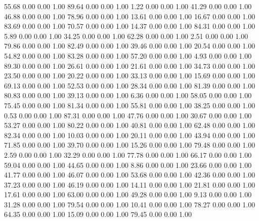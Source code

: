    55.68   0.00   0.00   1.00
   89.64   0.00   0.00   1.00
    1.22   0.00   0.00   1.00
   41.29   0.00   0.00   1.00
   46.88   0.00   0.00   1.00
   78.96   0.00   0.00   1.00
   13.61   0.00   0.00   1.00
   16.67   0.00   0.00   1.00
   83.69   0.00   0.00   1.00
   70.57   0.00   0.00   1.00
   14.37   0.00   0.00   1.00
   84.31   0.00   0.00   1.00
    5.89   0.00   0.00   1.00
   34.25   0.00   0.00   1.00
   62.28   0.00   0.00   1.00
    2.51   0.00   0.00   1.00
   79.86   0.00   0.00   1.00
   82.49   0.00   0.00   1.00
   39.46   0.00   0.00   1.00
   20.54   0.00   0.00   1.00
   54.82   0.00   0.00   1.00
   83.28   0.00   0.00   1.00
   57.20   0.00   0.00   1.00
    4.93   0.00   0.00   1.00
   89.30   0.00   0.00   1.00
   26.61   0.00   0.00   1.00
   21.61   0.00   0.00   1.00
   34.73   0.00   0.00   1.00
   23.50   0.00   0.00   1.00
   20.22   0.00   0.00   1.00
   33.13   0.00   0.00   1.00
   15.69   0.00   0.00   1.00
   69.13   0.00   0.00   1.00
   52.53   0.00   0.00   1.00
   28.34   0.00   0.00   1.00
   81.39   0.00   0.00   1.00
   80.83   0.00   0.00   1.00
   39.13   0.00   0.00   1.00
    6.36   0.00   0.00   1.00
   58.05   0.00   0.00   1.00
   75.45   0.00   0.00   1.00
   81.34   0.00   0.00   1.00
   55.81   0.00   0.00   1.00
   38.25   0.00   0.00   1.00
    0.53   0.00   0.00   1.00
   87.31   0.00   0.00   1.00
   47.76   0.00   0.00   1.00
   30.67   0.00   0.00   1.00
   53.27   0.00   0.00   1.00
   80.22   0.00   0.00   1.00
   40.81   0.00   0.00   1.00
   62.48   0.00   0.00   1.00
   82.34   0.00   0.00   1.00
   10.03   0.00   0.00   1.00
   20.11   0.00   0.00   1.00
   43.94   0.00   0.00   1.00
   71.85   0.00   0.00   1.00
   39.70   0.00   0.00   1.00
   15.26   0.00   0.00   1.00
   79.48   0.00   0.00   1.00
    2.59   0.00   0.00   1.00
   32.29   0.00   0.00   1.00
   77.78   0.00   0.00   1.00
   66.17   0.00   0.00   1.00
   59.04   0.00   0.00   1.00
   44.65   0.00   0.00   1.00
    8.86   0.00   0.00   1.00
   23.66   0.00   0.00   1.00
   41.77   0.00   0.00   1.00
   46.07   0.00   0.00   1.00
   53.68   0.00   0.00   1.00
   42.36   0.00   0.00   1.00
   37.23   0.00   0.00   1.00
   46.19   0.00   0.00   1.00
   14.11   0.00   0.00   1.00
   21.81   0.00   0.00   1.00
   17.61   0.00   0.00   1.00
   63.00   0.00   0.00   1.00
   49.28   0.00   0.00   1.00
    9.13   0.00   0.00   1.00
   31.28   0.00   0.00   1.00
   79.54   0.00   0.00   1.00
   10.41   0.00   0.00   1.00
   78.27   0.00   0.00   1.00
   64.35   0.00   0.00   1.00
   15.09   0.00   0.00   1.00
   79.45   0.00   0.00   1.00
